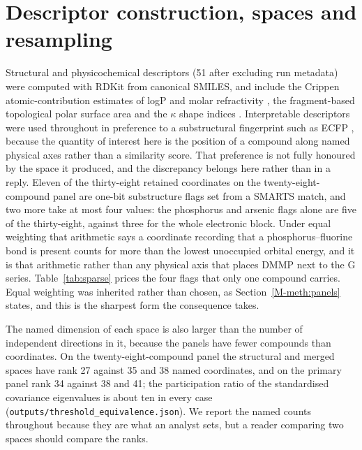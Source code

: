 \documentclass[11pt,a4paper]{article}
\begin{document}
\section{Descriptor construction, spaces and resampling}
\label{meth:descriptors}

Structural and physicochemical descriptors (51 after excluding run metadata)
were computed with RDKit \cite{rdkit} from canonical SMILES, and include the
Crippen atomic-contribution estimates of logP and molar refractivity
\cite{wildman1999}, the fragment-based topological polar surface area
\cite{ertl2000} and the $\kappa$ shape indices \cite{kier1985}. Interpretable
descriptors were used throughout in preference to a substructural fingerprint
such as ECFP \cite{rogers2010}, because the quantity of interest here is the
position of a compound along named physical axes rather than a similarity score.
That preference is not fully honoured by the space it produced, and the
discrepancy belongs here rather than in a reply. Eleven of the thirty-eight
retained coordinates on the twenty-eight-compound panel are one-bit
substructure flags set from a SMARTS match, and two more take at most four
values: the phosphorus and arsenic flags alone are five of the thirty-eight,
against three for the whole electronic block. Under equal weighting that
arithmetic says a coordinate recording that a phosphorus--fluorine bond is
present counts for more than the lowest unoccupied orbital energy, and it is
that arithmetic rather than any physical axis that places DMMP next to the G
series. Table~\ref{tab:sparse} prices the four flags that only one compound
carries. Equal weighting was inherited rather than chosen, as
Section~\ref{M-meth:panels} states, and this is the sharpest form the
consequence takes.

The named dimension of each space is also larger than the number of independent
directions in it, because the panels have fewer compounds than coordinates.
On the twenty-eight-compound panel the structural and merged spaces have rank
27 against 35 and 38 named coordinates, and on the primary panel rank 34
against 38 and 41; the participation ratio of the standardised covariance
eigenvalues is about ten in every case
(\texttt{outputs/\allowbreak threshold\_\allowbreak equivalence.json}). We report the named counts
throughout because they are what an analyst sets, but a reader comparing two
spaces should compare the ranks.
\end{document}

